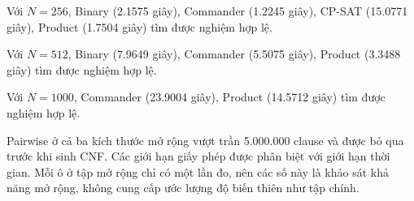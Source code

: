 Với $N=256$, Binary (2.1575 giây), Commander (1.2245 giây), CP-SAT (15.0771 giây), Product (1.7504 giây) tìm được nghiệm hợp lệ.

Với $N=512$, Binary (7.9649 giây), Commander (5.5075 giây), Product (3.3488 giây) tìm được nghiệm hợp lệ.

Với $N=1000$, Commander (23.9004 giây), Product (14.5712 giây) tìm được nghiệm hợp lệ.

Pairwise ở cả ba kích thước mở rộng vượt trần 5.000.000 clause và được bỏ qua trước khi sinh CNF. Các giới hạn giấy phép được phân biệt với giới hạn thời gian. Mỗi ô ở tập mở rộng chỉ có một lần đo, nên các số này là khảo sát khả năng mở rộng, không cung cấp ước lượng độ biến thiên như tập chính.

